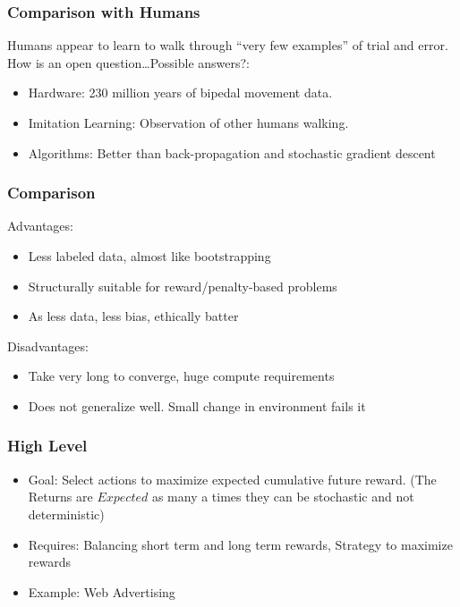 \begin{frame}[fragile]\frametitle{Comparison with Humans}

Humans appear to learn to walk through ``very few examples'' of trial and error. How is an open question…Possible answers?:
\begin{itemize}
\item Hardware: 230 million years of bipedal movement data.
\item Imitation Learning: Observation of other humans walking.
\item Algorithms: Better than back-propagation and stochastic gradient descent
\end{itemize}


\end{frame}



\begin{frame}[fragile]\frametitle{Comparison}

Advantages:
\begin{itemize}
\item Less labeled data, almost like bootstrapping
\item Structurally suitable for reward/penalty-based problems
\item As less data, less bias, ethically batter
\end{itemize}

Disadvantages:
\begin{itemize}
\item Take very long to converge, huge compute requirements
\item Does not generalize well. Small change in environment fails it
\end{itemize}

\end{frame}


\begin{frame}[fragile]\frametitle{High Level}

\begin{itemize}
\item   Goal: Select actions to maximize expected cumulative future reward. (The Returns are $Expected$ as many a times they can be stochastic and not deterministic)
\item   Requires: Balancing short term and long term rewards, Strategy to maximize rewards
\item   Example: Web Advertising
\end{itemize}


\end{frame}



